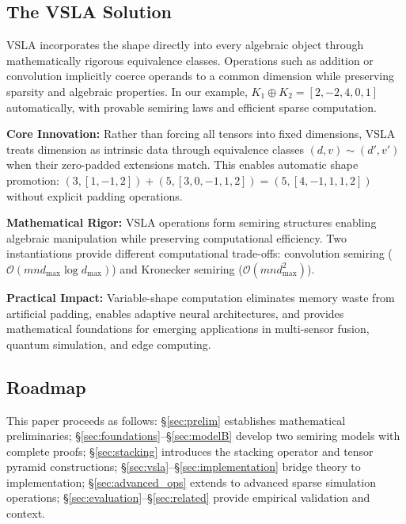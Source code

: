 \subsection{The VSLA Solution}
VSLA incorporates the shape directly into every algebraic object through mathematically rigorous equivalence classes.  Operations such as addition or convolution implicitly coerce operands to a common dimension while preserving sparsity and algebraic properties. In our example, $K_1 \oplus K_2 = [2, -2, 4, 0, 1]$ automatically, with provable semiring laws and efficient sparse computation.

\textbf{Core Innovation:} Rather than forcing all tensors into fixed dimensions, VSLA treats dimension as intrinsic data through equivalence classes $(d,v) \sim (d',v')$ when their zero-padded extensions match. This enables automatic shape promotion: $(3,[1,-1,2]) + (5,[3,0,-1,1,2]) = (5,[4,-1,1,1,2])$ without explicit padding operations.

\textbf{Mathematical Rigor:} VSLA operations form semiring structures enabling algebraic manipulation while preserving computational efficiency. Two instantiations provide different computational trade-offs: convolution semiring ($\mathcal{O}(mn d_{\max} \log d_{\max})$) and Kronecker semiring ($\mathcal{O}(mn d_{\max}^2)$).

\textbf{Practical Impact:} Variable-shape computation eliminates memory waste from artificial padding, enables adaptive neural architectures, and provides mathematical foundations for emerging applications in multi-sensor fusion, quantum simulation, and edge computing.

\subsection{Roadmap}
This paper proceeds as follows: \S\ref{sec:prelim} establishes mathematical preliminaries; \S\ref{sec:foundations}–\S\ref{sec:modelB} develop two semiring models with complete proofs; \S\ref{sec:stacking} introduces the stacking operator and tensor pyramid constructions; \S\ref{sec:vsla}–\S\ref{sec:implementation} bridge theory to implementation; \S\ref{sec:advanced_ops} extends to advanced sparse simulation operations; \S\ref{sec:evaluation}–\S\ref{sec:related} provide empirical validation and context.
